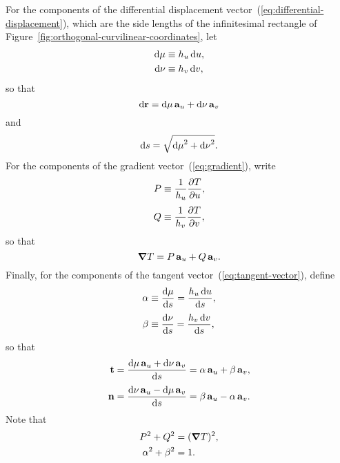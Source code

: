 For the components of the differential displacement
vector~(\ref{eq:differential-displacement}),
which are the side lengths of the infinitesimal rectangle
of Figure~\ref{fig:orthogonal-curvilinear-coordinates},
let
\begin{align}
  \td \mu &\defeq \scalefac[u] \td u,
    \label{eq:differential-displacement-u-component} \\
  \td \nu &\defeq \scalefac[v] \td v,
    \label{eq:differential-displacement-v-component}
\end{align}
so that
\begin{equation}
  \mathop{}\!\mathrm{d} \boldsymbol{\mathrm{r}} = \mathop{}\!\mathrm{d} \mu \mathop{}\!\boldsymbol{\mathrm{a}}_{u} + \mathop{}\!\mathrm{d} \nu \mathop{}\!\boldsymbol{\mathrm{a}}_{v}
  \label{eq:differential-displacement-abbreviated}
\end{equation}
and
\begin{equation}
  \mathop{}\!\mathrm{d} s = \sqrt{{\mathop{}\!\mathrm{d} \mu}^2 + {\mathop{}\!\mathrm{d} \nu}^2}.
  \label{eq:differential-arc-length-abbreviated}
\end{equation}
For the components of the gradient vector~(\ref{eq:gradient}),
write
\begin{align}
  P &\defeq \frac{1}{\scalefac[u]} \pder{T}{u},
    \label{eq:gradient-u-component} \\[\fraclinespace]
  Q &\defeq \frac{1}{\scalefac[v]} \pder{T}{v},
    \label{eq:gradient-v-component}
\end{align}
so that
\begin{equation}
  \mathop{}\!\boldsymbol{\mathrm{\nabla}} T = P \mathop{}\!\boldsymbol{\mathrm{a}}_{u} + Q \mathop{}\!\boldsymbol{\mathrm{a}}_{v}.
  \label{eq:gradient-abbreviated}
\end{equation}
Finally, for the components of
the tangent vector~(\ref{eq:tangent-vector}), define
\begin{align}
  \alpha &\defeq \tder{\mu}{s} = \frac{\scalefac[u] \td u}{\td s},
    \label{eq:tangent-u-component} \\[\fraclinespace]
  \beta &\defeq \tder{\nu}{s} = \frac{\scalefac[v] \td v}{\td s},
    \label{eq:tangent-v-component}
\end{align}
so that
\begin{align}
  \tangentvec
  &= \frac{\td \mu \basisvec{u} + \td \nu \basisvec{v}}{\td s}
  = \alpha \basisvec{u} + \beta \basisvec{v},
    \label{eq:tangent-vector-abbreviated} \\[\fraclinespace]
  \normalvec
  &= \frac{\td \nu \basisvec{u} - \td \mu \basisvec{v}}{\td s}
  = \beta \basisvec{u} - \alpha \basisvec{v}.
    \label{eq:normal-vector-abbreviated}
\end{align}
Note that
\begin{align}
  P^2 + Q^2 &= (\mathop{}\!\boldsymbol{\mathrm{\nabla}} T)^2, \label{eq:gradient-pythagoras} \\
  \alpha^2 + \beta^2 &= 1. \label{eq:tangent-pythagoras}
\end{align}

